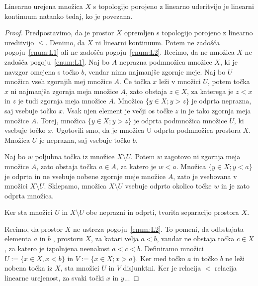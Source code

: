 \documentclass[../TG_magistrsko_delo_sections.tex]{subfiles}
\begin{document}
\begin{trditev}
Linearno urejena množica $X$ s topologijo porojeno z linearno uderitvijo je linearni kontinuum natanko tedaj, ko je povezana.
\end{trditev}
\begin{proof}
Predpostavimo, da je prostor $X$ opremljen s topologijo porojeno z linearno ureditvijo $\leq$. Denimo, da $X$ ni linearni kontinuum. Potem ne zadošča pogoju~\ref{enum:L1} ali ne zadošča pogoju~\ref{enum:L2}. Recimo, da ne množica $X$ ne zadošča pogoju~\ref{enum:L1}. Naj bo $A$ neprazna podmnožica množice $X$, ki je navzgor omejena s točko $b$, vendar nima najmanjše zgornje meje. Naj bo $U$ množica vseh zgornjih mej množice $A$. Če točka $x$ leži v množici $U$, potem točka $x$ ni najmanjša zgornja meja množice $A$, zato obstaja $z \in X$, za katerega je $z < x$ in $z$ je tudi zgornja meja množice $A$. Množica $\{y \in X; y > z\}$ je odprta neprazna, saj vsebuje točko $x$. Vsak njen element je večji os točke $z$ in je tako zgornja meja množice $A$. Torej, množica $\{y \in X; y > z\}$ je odprta podmnožica množice $U$, ki vsebuje točko $x$. Ugotovili smo, da je množica U odprta podmnožica prostora $X$. Množica $U$ je neprazna, saj vsebuje točko $b$. 

Naj bo $w$ poljubna točka iz množice $X \setminus U$. Potem $w$ zagotovo ni zgornja meja množice $A$, zato obstaja točka $a \in A$, za katero je $w < a$. Množica $\{y \in X; y< a\}$ je odprta in ne vsebuje nobene zgornje meje množice $A$, zato je vsebovana v množici $X \setminus U$. Sklepamo, množica $X \setminus U$ vsebuje odprto okolico točke $w$ in je zato odprta množica. 

Ker sta množici $U$ in $X \setminus U$ obe neprazni in odprti, tvorita separacijo prostora $X$. 

Recimo, da prostor $X$ ne ustreza pogoju~\ref{enum:L2}. To pomeni, da odbstajata elementa $a$ in $b$ , prostoru $X$, za katari velja $a < b$, vandar ne obstaja točka $c \in X$, za katero je izpolnjena neenakost $a < c < b$. Definiramo množici $U := \{x \in X, x <b\}$ in $V:= \{x\in X;x>a\}$. Ker med točko $a$ in točko $b$ ne leži nobena točka iz $X$, sta množici $U$ in $V$ disjunktni. Ker je relacija $<$ relacija linearne urejenost, za svaki točki $x$ in $y$...
\end{proof}
\end{document}
